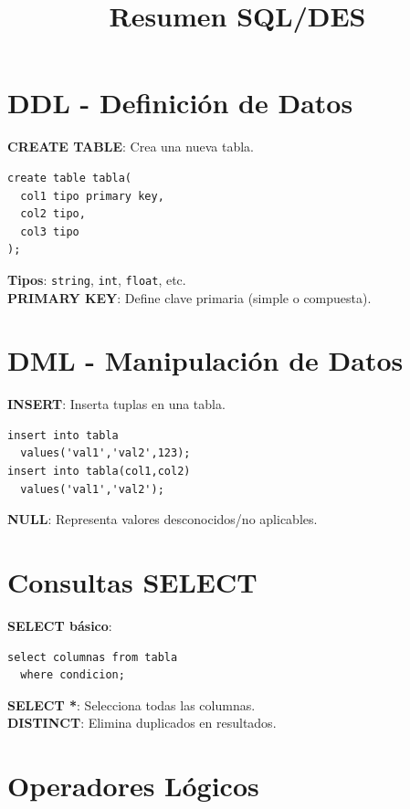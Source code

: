 \documentclass[10pt,a4paper,twocolumn]{article}
\title{\textbf{Resumen SQL/DES}}
\author{}
\date{}
\begin{document}
\small

\maketitle

\vspace{1em}
\section{DDL - Definición de Datos}

\textbf{CREATE TABLE}: Crea una nueva tabla.
\begin{lstlisting}
create table tabla(
  col1 tipo primary key,
  col2 tipo,
  col3 tipo
);
\end{lstlisting}

\textbf{Tipos}: \texttt{string}, \texttt{int}, \texttt{float}, etc.\\
\textbf{PRIMARY KEY}: Define clave primaria (simple o compuesta).

\section{DML - Manipulación de Datos}

\textbf{INSERT}: Inserta tuplas en una tabla.
\begin{lstlisting}
insert into tabla 
  values('val1','val2',123);
insert into tabla(col1,col2) 
  values('val1','val2');
\end{lstlisting}

\textbf{NULL}: Representa valores desconocidos/no aplicables.

\section{Consultas SELECT}

\textbf{SELECT básico}:
\begin{lstlisting}
select columnas from tabla
  where condicion;
\end{lstlisting}

\textbf{SELECT *}: Selecciona todas las columnas.\\
\textbf{DISTINCT}: Elimina duplicados en resultados.

\section{Operadores Lógicos}
\end{document}

